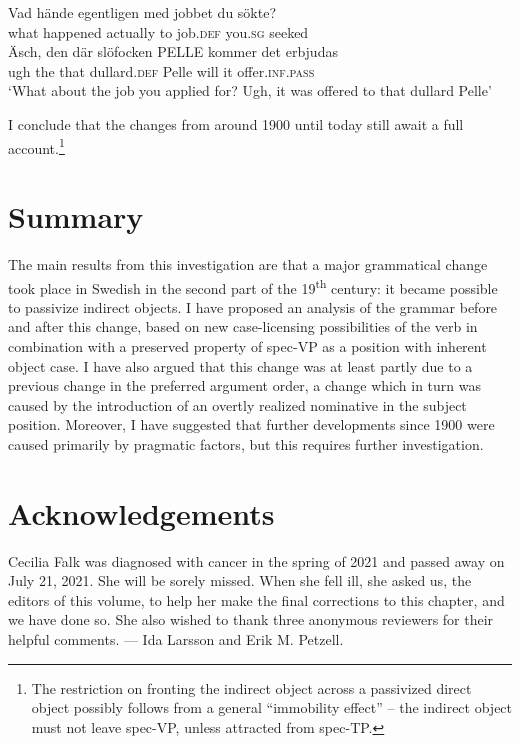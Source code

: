 \documentclass[output=paper]{langscibook}
\begin{document}
\ea%
    \label{ex:falk:28}
\gll Vad    hände    egentligen  med  jobbet    du      sökte?\\
    what    happened  actually    to    job.\textsc{def}  you.\textsc{sg}  seeked\\

\gll Äsch,  den  där  slöfocken    PELLE  kommer  det  erbjudas\\
    ugh    the  that  dullard.\textsc{def}    Pelle    will      it    offer.\textsc{inf.pass}\\
\glt ‘What about the job you applied for? Ugh, it was offered to that dullard Pelle’
\z



I conclude that the changes from around 1900 until today still await a full account.\footnote{The restriction on fronting the indirect object across a passivized direct object possibly follows from a general “immobility effect” – the indirect object must not leave spec-VP, unless attracted from spec-TP.}

\section{Summary}\label{sec:falk:6}


The main results from this investigation are that a major grammatical change took place in Swedish in the second part of the 19\textsuperscript{th} century: it became possible to passivize indirect objects. I have proposed an analysis of the grammar before and after this change, based on new case-licensing possibilities of the verb in combination with a preserved property of spec-VP as a position with inherent object case. I have also argued that this change was at least partly due to a previous change in the preferred argument order, a change which in turn was caused by the introduction of an overtly realized nominative in the subject position. Moreover, I have suggested that further developments since 1900 were caused primarily by pragmatic factors, but this requires further investigation.

\section*{Acknowledgements}


Cecilia Falk was diagnosed with cancer in the spring of 2021 and passed away on July 21, 2021. She will be sorely missed. When she fell ill, she asked us, the editors of this volume, to help her make the final corrections to this chapter, and we have done so. She also wished to thank three anonymous reviewers for their helpful comments. \hfill--- Ida Larsson and Erik M. Petzell.\hbox{}\pagebreak
\end{document}
